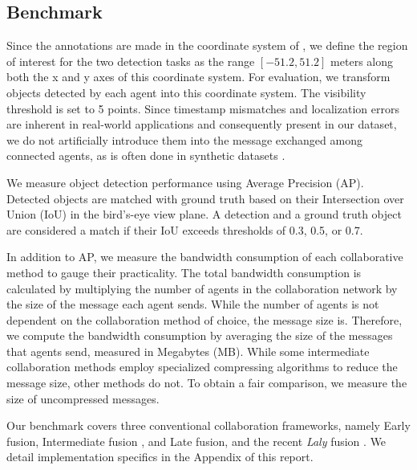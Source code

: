 


\subsection{Benchmark}
 Since the annotations are made in the coordinate system of \rsutop, we define the region of interest for the two detection tasks as the range $\left[-51.2, 51.2\right]$ meters along both the x and y axes of this coordinate system.
For evaluation, we transform objects detected by each agent into this coordinate system. The visibility threshold is set to 5 points.
Since timestamp mismatches and localization errors are inherent in real-world applications and consequently present in our dataset, we do not artificially introduce them into the message exchanged among connected agents, as is often done in synthetic datasets \cite{xu2022opv2v, xu2022v2x}.

We measure object detection performance using Average Precision (AP). Detected objects are matched with ground truth based on their Intersection over Union (IoU) in the bird's-eye view plane. A detection and a ground truth object are considered a match if their IoU exceeds thresholds of 0.3, 0.5, or 0.7.

In addition to AP, we measure the bandwidth consumption of each collaborative method to gauge their practicality. The total bandwidth consumption is calculated by multiplying the number of agents in the collaboration network by the size of the message each agent sends. 
While the number of agents is not dependent on the collaboration method of choice, the message size is.
Therefore, we compute the bandwidth consumption by averaging the size of the messages that agents send, measured in Megabytes (MB). 
While some intermediate collaboration methods \cite{wang2020v2vnet, li2021learning, xu2022v2x} employ specialized compressing algorithms to reduce the message size, other methods \cite{xu2022opv2v, lu2023robust, dao2024practical} do not.
To obtain a fair comparison, we measure the size of uncompressed messages.

Our benchmark covers three conventional collaboration frameworks, namely Early fusion, Intermediate fusion \cite{wang2020v2vnet, xu2022opv2v, chen2019f, xu2022v2x, li2023learning, hu2022where2comm}, and Late fusion, and the recent \textit{Laly} fusion \cite{dao2024practical}. We detail implementation specifics in the Appendix of this report.

